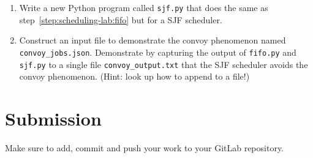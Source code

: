 \begin{enumerate}
\item
  Write a new Python program called \texttt{sjf.py} that does the same as step~\ref{step:scheduling-lab:fifo} but for a SJF scheduler.

\item
  Construct an input file to demonstrate the convoy phenomenon named \texttt{convoy_jobs.json}.
  Demonstrate by capturing the output of \texttt{fifo.py} and \texttt{sjf.py} to a single file \texttt{convoy_output.txt} that the SJF scheduler avoids the convoy phenomenon.
  (Hint: look up how to append to a file!)
  
\end{enumerate}

\section{Submission}

Make sure to add, commit and push your work to your GitLab repository.

